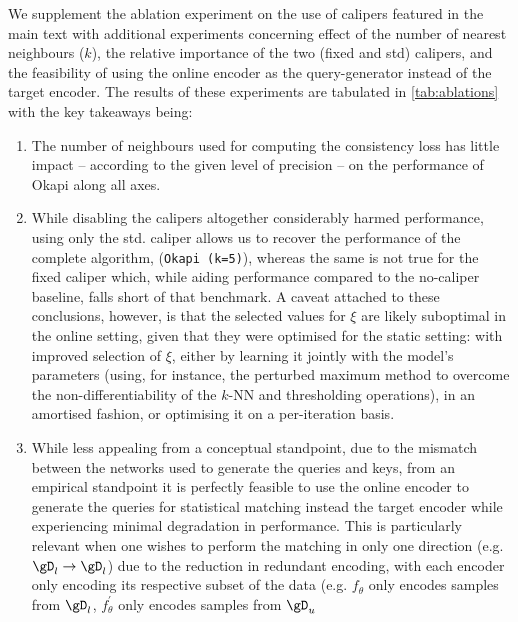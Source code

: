  We supplement the ablation experiment on the use of calipers featured in the main text with
 additional experiments concerning effect of the number of nearest neighbours ($k$), the relative
 importance of the two (fixed and std) calipers, and the feasibility of using the online encoder as
 the query-generator instead of the target encoder.
 The results of these experiments are tabulated in \ref{tab:ablations} with the key takeaways
 being: \begin{enumerate} 
     \item The number of neighbours used for computing the consistency loss
         has little impact -- according to the given level of precision -- on the performance of Okapi
        along all axes.
     \item While disabling the calipers altogether considerably harmed performance, using only the
         std. caliper allows us to recover the performance of the complete algorithm,
         (\texttt{Okapi (k=5)}), whereas the same is not true for the fixed caliper which, while
         aiding performance compared to the no-caliper baseline, falls short of that benchmark.
         A caveat attached to these conclusions, however, is that the selected values for $\xi$ are
         likely suboptimal in the online setting, given that they were optimised for the static
         setting: with improved selection of $\xi$, either by learning it jointly with the model's
         parameters (using, for instance, the perturbed maximum method \citep{berthet2020learning}
         to overcome the non-differentiability of the $k$-NN and thresholding operations), in an
         amortised fashion, or optimising it on a per-iteration basis.
    \item While less appealing from a conceptual standpoint, due to the mismatch between the
        networks used to generate the queries and keys, from an empirical standpoint it is
        perfectly feasible to use the online encoder to generate the queries for statistical
        matching instead the target encoder while experiencing minimal degradation in performance.
        This is particularly relevant when one wishes to perform the matching in only one direction
        (e.g. \( \gD_l \to \gD_l \)) due to the reduction in redundant encoding, with each
        encoder only encoding its respective subset of the data (e.g. $f_\theta$ only encodes
        samples from $\gD_l$, \( f_\theta^\prime \) only encodes samples from \( \gD_u \)
\end{enumerate}


